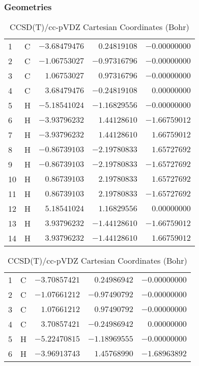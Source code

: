 \documentclass[10pt,oneside]{article}
\begin{document}
\begin{table}[h!]
\subsubsection*{Geometries}
\begin{multicols}{2}
\centering
\caption{CCSD(T)/cc-pVTZ Cartesian Coordinates (Bohr)}
\begin{tabular}{llrrr}
\toprule
1  & C  & $-3.68479476$ & $ 0.24819108$ & $-0.00000000$ \\
2  & C  & $-1.06753027$ & $-0.97316796$ & $-0.00000000$ \\
3  & C  & $ 1.06753027$ & $ 0.97316796$ & $-0.00000000$ \\
4  & C  & $ 3.68479476$ & $-0.24819108$ & $ 0.00000000$ \\
5  & H  & $-5.18541024$ & $-1.16829556$ & $-0.00000000$ \\
6  & H  & $-3.93796232$ & $ 1.44128610$ & $-1.66759012$ \\
7  & H  & $-3.93796232$ & $ 1.44128610$ & $ 1.66759012$ \\
8  & H  & $-0.86739103$ & $-2.19780833$ & $ 1.65727692$ \\
9  & H  & $-0.86739103$ & $-2.19780833$ & $-1.65727692$ \\
10 & H  & $ 0.86739103$ & $ 2.19780833$ & $ 1.65727692$ \\
11 & H  & $ 0.86739103$ & $ 2.19780833$ & $-1.65727692$ \\
12 & H  & $ 5.18541024$ & $ 1.16829556$ & $ 0.00000000$ \\
13 & H  & $ 3.93796232$ & $-1.44128610$ & $-1.66759012$ \\
14 & H  & $ 3.93796232$ & $-1.44128610$ & $ 1.66759012$ \\
\bottomrule
\end{tabular}
\caption{CCSD(T)/cc-pVDZ Cartesian Coordinates (Bohr)}
\begin{tabular}{llrrr}
\toprule
1  & C  & $-3.70857421$ & $ 0.24986942$ & $-0.00000000$ \\
2  & C  & $-1.07661212$ & $-0.97490792$ & $-0.00000000$ \\
3  & C  & $ 1.07661212$ & $ 0.97490792$ & $-0.00000000$ \\
4  & C  & $ 3.70857421$ & $-0.24986942$ & $ 0.00000000$ \\
5  & H  & $-5.22470815$ & $-1.18969555$ & $-0.00000000$ \\
6  & H  & $-3.96913743$ & $ 1.45768990$ & $-1.68963892$ \\

\end{tabular}
\end{multicols}
\end{table}
\end{document}
